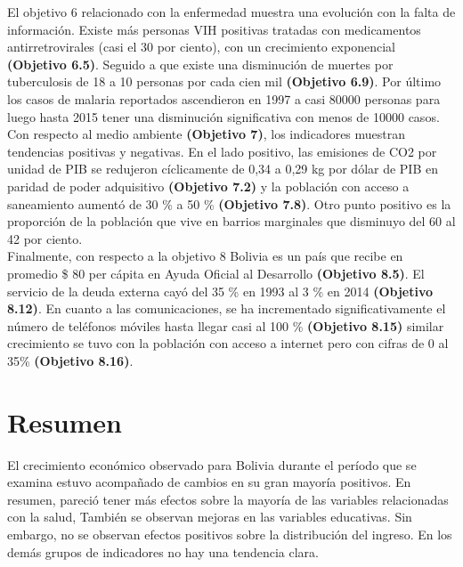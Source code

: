 El objetivo 6 relacionado con la enfermedad muestra una evolución  con la falta de información. Existe  más personas VIH positivas tratadas con medicamentos antirretrovirales (casi el 30 por ciento), con un crecimiento  exponencial \textbf{(Objetivo 6.5)}. Seguido a que existe una disminución de muertes por tuberculosis de 18 a 10 personas por cada cien mil \textbf{(Objetivo 6.9)}. Por último los casos de malaria reportados ascendieron en 1997 a casi 80000 personas para luego hasta 2015 tener una disminución significativa con menos de 10000 casos.\\
Con respecto al medio ambiente \textbf{(Objetivo 7)}, los indicadores muestran tendencias positivas y negativas. En el lado positivo, las emisiones de CO2 por unidad de PIB se redujeron cíclicamente de 0,34 a 0,29 kg por dólar de PIB en paridad de poder adquisitivo \textbf{(Objetivo 7.2)} y la población con acceso a saneamiento aumentó de 30 \% a 50 \% \textbf{(Objetivo 7.8)}. Otro punto positivo es la proporción de la población que vive en barrios marginales que disminuyo del 60 al 42 por ciento.\\
Finalmente, con respecto a la objetivo 8 Bolivia es un país que recibe en promedio  \$ 80 per cápita en Ayuda Oficial al Desarrollo \textbf{(Objetivo 8.5)}. El servicio de la deuda externa cayó del 35 \% en 1993 al 3 \% en 2014 \textbf{(Objetivo 8.12)}. En cuanto a las comunicaciones, se ha incrementado significativamente el número de teléfonos móviles hasta llegar casi al 100 \% \textbf{(Objetivo 8.15)} similar crecimiento se tuvo con la población con acceso a internet pero con cifras de 0 al 35\% \textbf{(Objetivo 8.16)}. 


\section{Resumen}
El crecimiento económico observado para Bolivia durante el período que se examina estuvo acompañado de cambios en su gran mayoría positivos. En resumen, pareció tener más efectos sobre la mayoría de las variables relacionadas con la salud,  También se observan mejoras en las variables educativas. Sin embargo, no se observan efectos positivos sobre la distribución del ingreso. En los demás grupos de indicadores no hay una tendencia clara.




